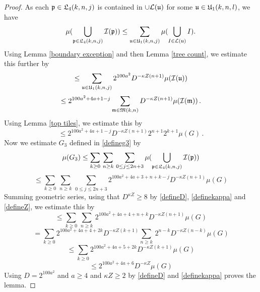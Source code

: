 {    \begin{proof}
As each $\fp\in \fL_4(k,n,j)$
is contained in $\cup\mathcal{L}(\fu)$ for some
$\fu\in \fU_1(k,n,l)$, we have
\begin{equation}
\mu(\bigcup_{\fp \in \fL_4 (k,n,j)}\sc(\fp))
\le \sum_{\fu\in \fU_1(k,n,j)}
\mu(\bigcup_{I \in \mathcal{L} (\fu)}I).
\end{equation}
Using Lemma \ref{boundary exception} and then Lemma \ref{tree count}, we estimate this further
 by
\begin{equation}
    \le \sum_{\fu\in \fU_1(k,n,j)}
    2^{100a^2} D^{-\kappa Z(n+1)}
        \mu(\sc(\mathfrak{u}))
\end{equation}
\begin{equation}
    \le 2^{100a^2+4a+1-j} \sum_{\mathfrak{m}\in \mathfrak{M}(k,n)}
     D^{-\kappa Z(n+1)}
    \mu(\sc(\mathfrak{m}))\,.
\end{equation}
Using Lemma \ref{top tiles}, we estimate this by
  \begin{equation}
     \le
2^{100a^2 + 4a + 1-j}  D^{-\kappa Z(n+1)}
     2^{n+1}2^{k+1}\mu(G)\, .
\end{equation}
Now we estimate $G_3$ defined in \eqref{defineg3} by
\begin{equation}
    \mu(G_3)\le \sum_{k\ge 0}\, \sum_{n \geq k}\,
    \sum_{0\le j\le 2n+3}
    \mu(\bigcup_{\fp \in \fL_4 (k,n,j)}
    \sc(\fp))
\end{equation}
\begin{equation}
    \le \sum_{k\ge 0}\, \sum_{n \geq k}\,
    \sum_{0\le j\le 2n+3}
    2^{100a^2 + 4a + 3 + n + k -j}  D^{-\kappa Z(n+1)}\mu(G)
\end{equation}
Summing geometric series, using that $D^{\kappa Z}\ge 8$ by \eqref{defineD}, \eqref{definekappa} and \eqref{defineZ}, we estimate this by
\begin{equation}
    \le \sum_{k\ge 0}\, \sum_{n \geq k}\,
    2^{100a^2 + 4a + 4 + n + k}  D^{-\kappa Z(n+1)}\mu(G)
\end{equation}
\begin{equation}
    = \sum_{k\ge 0} 2^{100a^2 + 4a + 4 + 2k} D^{-\kappa Z(k+1)} \sum_{n \geq k}\,
    2^{n - k}  D^{-\kappa Z(n-k)}\mu(G)
\end{equation}
\begin{equation}
    \le \sum_{k\ge 0} 2^{100a^2 + 4a + 5 + 2k}  D^{-\kappa Z(k+1)}\mu(G)
\end{equation}
\begin{equation}
   \le 2^{100a^2 + 4a + 6}  D^{-\kappa Z}\mu(G)
\end{equation}
Using $D = 2^{100a^2}$ and $a \ge 4$ and $\kappa Z \ge 2$ by \eqref{defineD} and \eqref{definekappa} proves the lemma.
\end{proof}

}
